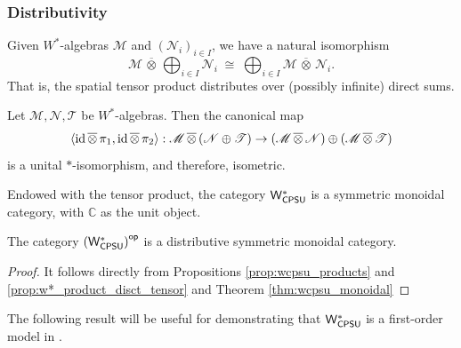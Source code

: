 \subsubsection{Distributivity}


\begin{proposition}\cite[Proposition 117 III] {westerbaanCategoryNeumannAlgebras2019} \label{prop:w*_product_disct_tensor}
  Given $W^*$-algebras \( \mathscr{M} \) and \( (\mathscr{N}_i)_{i \in I} \), we have a natural isomorphism
\[
\mathscr{M}  \,\overline{\otimes}\, \bigoplus_{i \in I} \mathscr{N}_i \;\cong\; \bigoplus_{i \in I} \mathscr{M}  \,\overline{\otimes}\, \mathscr{N}_i.
\]
That is, the spatial tensor product distributes over (possibly infinite) direct sums.
\end{proposition}

\begin{corollary} \cite[Theorem 3.2]{choSemanticsQuantumProgramming2016} \label{thm:w*_tensor_distributes_product}
  Let \( \mathscr{M}, \mathscr{N}, \mathscr{T} \) be \(W^*\)-algebras. Then the canonical map
\[
 \langle \mathrm{id} \, \overline{\otimes} \, \pi_1, \mathrm{id} \, \overline{\otimes} \, \pi_2 \rangle : \mathscr{M} \, \overline{\otimes} \, (\mathscr{N} \oplus \mathscr{T}) \to (\mathscr{M} \, \overline{\otimes} \, \mathscr{N}) \oplus (\mathscr{M} \, \overline{\otimes} \, \mathscr{T})
\]
is a unital $*$-isomorphism, and therefore, isometric.
\end{corollary}

\begin{theorem} \cite[Theorem 119 V]{westerbaanCategoryNeumannAlgebras2019} \label{thm:wcpsu_monoidal}
Endowed with the tensor product, the category $\mathsf{W^*_{CPSU}}$  is a symmetric monoidal category, with \( \mathbb{C} \) as the unit object.
\end{theorem}

\begin{theorem}
The category $\left(\mathsf{W^*_{CPSU}}\right)^{\mathsf{op}}$ is a distributive symmetric monoidal category.
\end{theorem}

\begin{proof}
  It follows directly from Propositions \ref{prop:wcpsu_products} and \ref{prop:w*_product_disct_tensor} and Theorem \ref{thm:wcpsu_monoidal}
\end{proof}

The following result will be useful for demonstrating that $\mathsf{W^*_{CPSU}}$ is a first-order model in .




